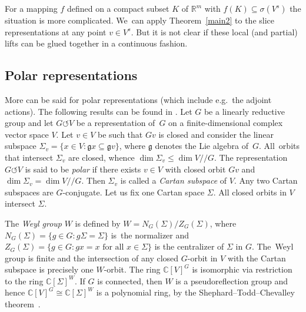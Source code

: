 \documentclass[pdftex]{sigma}
\numberwithin{equation}{section}
\def\si{\sigma}
\def\Si{\Sigma}
\def\C{\mathbb{C}}
\def\R{\mathbb{R}}
\def\cq{{/\!\!/}}
\def\acts{\circlearrowleft}
\begin{document}
For a mapping $f$ defined on a compact subset $K$ of $\R^m$ with $f(K) \subseteq \si(V^s)$ the situation is
more complicated. We~can apply Theorem~\ref{main2} to the slice representations at any point $v \in V^s$.
But it is not clear if these local (and partial) lifts can be glued together in a continuous fashion.

\subsection{Polar representations}
More can be said for polar representations (which include e.g.\ the adjoint actions). The following results can be found in \cite{DK85}.
Let $G$ be a linearly reductive group and let $G \acts V$ be a representation of~$G$ on a finite-dimensional
complex vector space $V$.
Let $v \in V$ be such that $Gv$ is closed and consider the linear subspace
$\Si_v =\{x \in V \colon \mathfrak g x \subseteq \mathfrak g v\}$, where $\mathfrak g$ denotes the Lie algebra of~$G$.
All~orbits that intersect $\Si_v$ are closed, whence $\dim \Si_v \le \dim V \cq G$.
The representation $G \acts V$ is said to be \emph{polar} if there exists $v \in V$ with closed orbit $Gv$
and $\dim \Si_v = \dim V \cq G$. Then $\Si_v$ is called a \emph{Cartan subspace} of $V$.
Any two Cartan subspaces are $G$-conjugate. Let us fix one Cartan space $\Si$.
All closed orbits in $V$ intersect $\Si$.

The \emph{Weyl group} $W$ is defined by $W = N_G(\Si)/Z_G(\Si)$, where $N_G(\Si)= \{ g \in G \colon g \Si = \Si\}$ is~the
normalizer and $Z_G(\Si)= \{ g \in G \colon g x = x \text{ for all }x \in\Si\}$ is the centralizer of $\Si$ in $G$.
The~Weyl group is finite and the intersection of any closed $G$-orbit in $V$ with the Cartan subspace is precisely
one $W$-orbit.
The ring $\C[V]^G$ is isomorphic via restriction to the ring $\C[\Si]^W$.
If $G$ is connected, then $W$ is a pseudoreflection group and hence $\C[V]^G \cong \C[\Si]^W$ is a polynomial ring,
by the Shephard--Todd--Chevalley theorem~\cite{Chevalley:1955aa, Serre:1968aa, Shephard:1954aa}.
\end{document}
